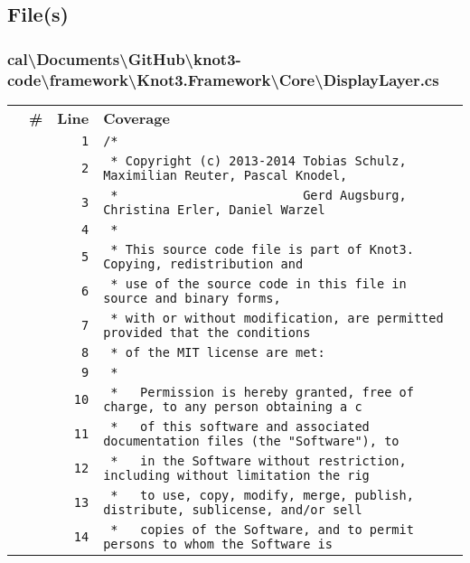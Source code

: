 \documentclass[a4paper,10pt]{article}
\begin{document}
\subsection{File(s)}
\subsubsection{cal\textbackslash Documents\textbackslash GitHub\textbackslash knot3-code\textbackslash framework\textbackslash Knot3.Framework\textbackslash Core\textbackslash DisplayLayer.cs}
\begin{longtable}[l]{lrrl}
\textbf{} & \textbf{\#} & \textbf{Line} & \textbf{Coverage}\\
\cellcolor{gray} &  & \verb~1~ & \verb~/*~\\
\cellcolor{gray} &  & \verb~2~ & \verb~ * Copyright (c) 2013-2014 Tobias Schulz, Maximilian Reuter, Pascal Knodel,~\\
\cellcolor{gray} &  & \verb~3~ & \verb~ *                         Gerd Augsburg, Christina Erler, Daniel Warzel~\\
\cellcolor{gray} &  & \verb~4~ & \verb~ *~\\
\cellcolor{gray} &  & \verb~5~ & \verb~ * This source code file is part of Knot3. Copying, redistribution and~\\
\cellcolor{gray} &  & \verb~6~ & \verb~ * use of the source code in this file in source and binary forms,~\\
\cellcolor{gray} &  & \verb~7~ & \verb~ * with or without modification, are permitted provided that the conditions~\\
\cellcolor{gray} &  & \verb~8~ & \verb~ * of the MIT license are met:~\\
\cellcolor{gray} &  & \verb~9~ & \verb~ *~\\
\cellcolor{gray} &  & \verb~10~ & \verb~ *   Permission is hereby granted, free of charge, to any person obtaining a c~\\
\cellcolor{gray} &  & \verb~11~ & \verb~ *   of this software and associated documentation files (the "Software"), to ~\\
\cellcolor{gray} &  & \verb~12~ & \verb~ *   in the Software without restriction, including without limitation the rig~\\
\cellcolor{gray} &  & \verb~13~ & \verb~ *   to use, copy, modify, merge, publish, distribute, sublicense, and/or sell~\\
\cellcolor{gray} &  & \verb~14~ & \verb~ *   copies of the Software, and to permit persons to whom the Software is~\\

\end{longtable}
\end{document}
